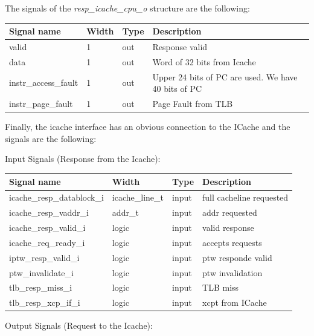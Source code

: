The signals of the \textit{resp\_icache\_cpu\_o} structure are the following:
\begin{table}[H]
	\centering
	\begin{tabular}{llll}
		\textbf{Signal name} & \textbf{Width} & \textbf{Type} & \textbf{Description} \\
		\hline
		valid & 1 & out & Response valid \\
		data & 1 & out & Word of 32 bits from Icache \\
		instr\_access\_fault & 1 & out & Upper 24 bits of PC are used. We have 40 bits of PC \\
		instr\_page\_fault & 1 & out & Page Fault from TLB \\
	\end{tabular}
\end{table}

Finally, the icache interface has an obvious connection to the ICache and the signals are the following:

Input Signals (Response from the Icache):


\begin{table}[H]
	\centering
	\begin{tabular}{llll}
		\textbf{Signal name} & \textbf{Width} & \textbf{Type} & \textbf{Description} \\
		\hline
		icache\_resp\_datablock\_i & icache\_line\_t & input & full cacheline requested \\
		icache\_resp\_vaddr\_i & addr\_t & input & addr requested \\    
		icache\_resp\_valid\_i & logic & input & valid response \\
		icache\_req\_ready\_i & logic & input & accepts requests \\
		iptw\_resp\_valid\_i & logic & input & ptw responde valid \\
		ptw\_invalidate\_i & logic & input & ptw invalidation \\
		tlb\_resp\_miss\_i & logic & input & TLB miss \\
		tlb\_resp\_xcp\_if\_i & logic & input & xcpt from ICache \\
		
	\end{tabular}
\end{table}

Output Signals (Request to the Icache):

